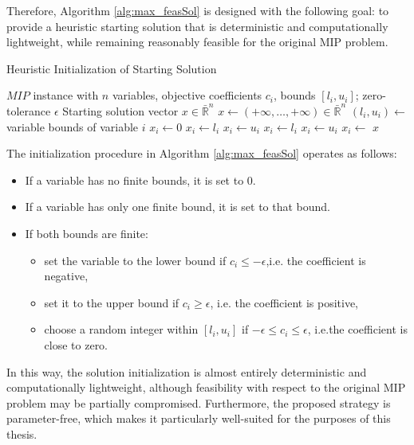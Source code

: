 Therefore, Algorithm \ref{alg:max_feasSol} is designed with the following goal: to provide a heuristic starting solution that is deterministic and computationally lightweight, while remaining reasonably feasible for the original MIP problem.  
\begin{algorithm}[H]
\caption{Heuristic Initialization of Starting Solution}\label{alg:max_feasSol}
\begin{algorithmic}[1]
\Require $MIP$ instance with $n$ variables, objective coefficients $c_i$, bounds $[l_i, u_i]$; zero-tolerance $\epsilon$
\Ensure Starting solution vector $x \in \bar{\mathbb{R}}^n$
    \State $x \gets ( +\infty, \ldots, +\infty ) \in \bar{\mathbb{R}}^n$
        \State $(l_i, u_i) \gets$ variable bounds of variable $i$
            \State $x_i \gets 0$
            \State $x_i \gets l_i$
            \State $x_i \gets u_i$
        \Else
                \State $x_i \gets l_i$
                \State $x_i \gets u_i$
            \Else
                \State $x_i \gets$ 
            \EndIf
        \EndIf
    \EndFor
    \State \Return $x$
\EndFunction
\end{algorithmic}
\end{algorithm}
The initialization procedure in Algorithm \ref{alg:max_feasSol} operates as follows:
\begin{itemize}
    \item If a variable has no finite bounds, it is set to $0$.
    \item If a variable has only one finite bound, it is set to that bound.
    \item If both bounds are finite:
    \begin{itemize}
        \item set the variable to the lower bound if $c_i \leq -\epsilon$,i.e. the coefficient is negative,
        \item set it to the upper bound if $c_i \geq \epsilon$, i.e. the coefficient is positive,
        \item choose a random integer within $[l_i, u_i]$ if $-\epsilon \leq c_i \leq \epsilon$, i.e.the coefficient is close to zero.
    \end{itemize}
\end{itemize}
In this way, the solution initialization is almost entirely deterministic and computationally lightweight, although feasibility with respect to the original MIP problem may be partially compromised. Furthermore, the proposed strategy is parameter-free, which makes it particularly well-suited for the purposes of this thesis.

